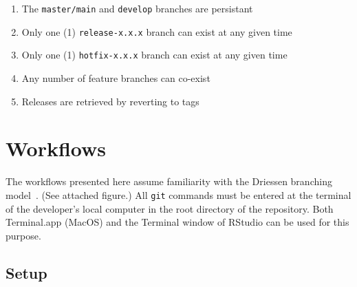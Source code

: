 \documentclass{article}
\begin{document}
\begin{enumerate}

  \item The \texttt{master/main} and \texttt{develop} branches are persistant

  \item Only one (1) \texttt{release-x.x.x} branch can exist at any given time

  \item Only one (1) \texttt{hotfix-x.x.x} branch can exist at any given time

  \item Any number of feature branches can co-exist

  \item Releases are retrieved by reverting to tags

\end{enumerate}


\section{Workflows}
\label{sec:workflows}

The workflows presented here assume familiarity
with the Driessen branching model~\cite{Driessen:2010}.
(See attached figure.)
All \texttt{git} commands must be entered
at the terminal of the developer's local computer
in the root directory of the repository.
Both Terminal.app (MacOS) and the Terminal window of RStudio
can be used for this purpose.


\subsection{Setup}
\label{sec:setup}
\end{document}
